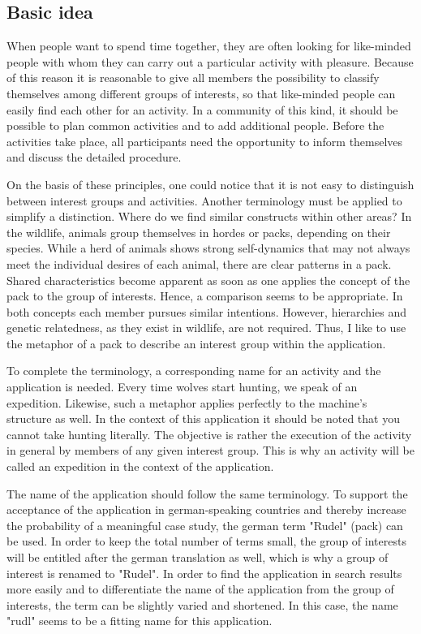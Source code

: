 \documentclass[12pt,numbers=noenddot,parskip,bibliography=totocnumbered,listof=totocnumbered,draft]{scrreprt}
\begin{document}
\subsection{Basic idea}
When people want to spend time together, they are often looking for like-minded people with whom they can carry out a particular activity with pleasure. Because of this reason it is reasonable to give all members the possibility to classify themselves among different groups of interests, so that like-minded people can easily find each other for an activity. In a community of this kind, it should be possible to plan common activities and to add additional people. Before the activities take place, all participants need the opportunity to inform themselves and discuss the detailed procedure.

On the basis of these principles, one could notice that it is not easy to distinguish between interest groups and activities. Another terminology must be applied to simplify a distinction. Where do we find similar constructs within other areas? In the wildlife, animals group themselves in hordes or packs, depending on their species. While a herd of animals shows strong self-dynamics that may not always meet the individual desires of each animal, there are clear patterns in a pack. Shared characteristics become apparent as soon as one applies the concept of the pack to the group of interests. Hence, a comparison seems to be appropriate. In both concepts each member pursues similar intentions. However, hierarchies and genetic relatedness, as they exist in wildlife, are not required. Thus, I like to use the metaphor of a pack to describe an interest group within the application.

To complete the terminology, a corresponding name for an activity and the application is needed. Every time wolves start hunting, we speak of an expedition. Likewise, such a metaphor applies perfectly to the machine's structure as well. In the context of this application it should be noted that you cannot take hunting literally. The objective is rather the execution of the activity in general by members of any given interest group. This is why an activity will be called an expedition in the context of the application.

The name of the application should follow the same terminology. To support the acceptance of the application in german-speaking countries and thereby increase the probability of a meaningful case study, the german term "Rudel" (pack) can be used. In order to keep the total number of terms small, the group of interests will be entitled after the german translation as well, which is why a group of interest is renamed to "Rudel". In order to find the application in search results more easily and to differentiate the name of the application from the group of interests, the term can be slightly varied and shortened. In this case, the name "rudl" seems to be a fitting name for this application.
\end{document}
